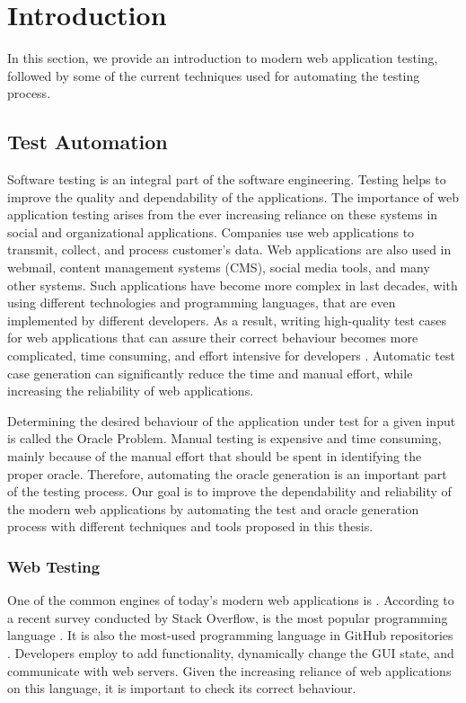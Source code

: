 \chapter{Introduction} \label{chap:intro}
In this section, we provide an introduction to modern web application testing, followed by some of the current techniques used for automating the testing process.

\section{Test Automation} \label{Sec:web-testing}
Software testing is an integral part of the software engineering.
Testing helps to improve the quality and dependability of the applications.
The importance of web application testing arises from the ever increasing reliance on these systems in social and organizational applications. Companies use web applications to transmit, collect, and process customer's data. Web applications are also used in webmail, content management systems (CMS), social media tools, and many other systems.
Such applications have become more complex in last decades, with using different technologies and programming languages, that are even implemented by different developers.
As a result, writing high-quality test cases for web applications that can assure their correct behaviour becomes more complicated, time consuming, and effort intensive for developers \cite{anand:jss13}.
Automatic test case generation can significantly reduce the time and manual effort, while
increasing the reliability of web applications.

Determining the desired behaviour of the application under test for a given input is called the Oracle Problem.
Manual testing is expensive and time consuming, mainly because of the manual effort that should be spent in identifying the proper oracle. Therefore, automating the oracle generation is an important part of the testing process. Our goal is to improve the dependability and reliability of the modern web applications by automating the test and oracle generation process with different techniques and tools proposed in this thesis.

\subsection{Web Testing}
One of the common engines of today's modern web applications is \javascript.
According to a recent survey conducted by Stack Overflow, \javascript is the most popular programming language \cite{stackoverflow15}.
It is also the most-used programming language in GitHub repositories \cite{githut15}.
Developers employ \javascript to add functionality, dynamically change the GUI state,
and communicate with web servers. Given the increasing reliance of web applications on this language, it is important to check its correct behaviour.

